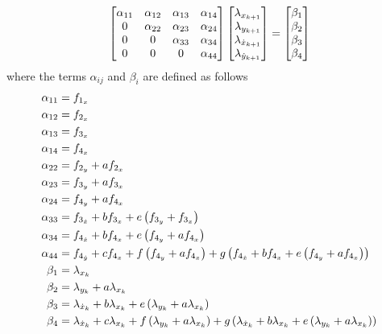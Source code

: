\documentclass[letterpaper, preprint, paper,11pt]{AAS}	%
\begin{document}
\begin{align}\label{eq:costate_ref}
	\begin{bmatrix} 
		\alpha_{11} & \alpha_{12} & \alpha_{13} & \alpha_{14} \\
		0 & \alpha_{22} & \alpha_{23} & \alpha_{24} \\
		0 & 0 & \alpha_{33} & \alpha_{34} \\
		0 & 0 & 0 & \alpha_{44}
	\end{bmatrix}
	\begin{bmatrix} \lambda_{\xkp} \\ \lambda_{\ykp} \\ \lambda_{\xdotkp} \\ \lambda_{\ydotkp} \end{bmatrix}
	=
	\begin{bmatrix} \beta_1 \\ \beta_2 \\ \beta_3 \\ \beta_4 \end{bmatrix}
\end{align}
where the terms \( \alpha_{ij} \) and \( \beta_{i} \) are defined as follows
\begin{subequations}
\begin{align}
	\alpha_{11} &= f_{1_x} \\
	\alpha_{12} &= f_{2_x} \\
	\alpha_{13} &= f_{3_x} \\
	\alpha_{14} &= f_{4_x} \\
	\alpha_{22} &= f_{2_y} + a f_{2_x} \\
	\alpha_{23} &= f_{3_y} + af_{3_x} \\
	\alpha_{24} &= f_{4_y} + a f_{4_x} \\
	\alpha_{33} &= f_{3_{\dot x}} + b f_{3_x} + e \left( f_{3_y} + f_{3_x} \right)\\
	\alpha_{34} &= f_{4_{\dot x}} + b f_{4_x} + e \left( f_{4_y} + a f_{4_x} \right) \\
	\alpha_{44} &= f_{4_{\dot y}} + c f_{4_x} + f \left( f_{4_y} + a f_{4_x} \right) + g \left( f_{4_{\dot x}} + b f_{4_x} + e \left( f_{4_y} + a f_{4_x} \right) \right) \\
	\beta_1 &= \lambda_{x_k} \\
	\beta_2 &= \lambda_{y_{k}} + a \lambda_{x_k} \\
	\beta_3 &= \lambda_{\dot{x}_{k}} + b \lambda_{x_k} + e \left( \lambda_{y_{k}} + a \lambda_{x_k} \right) \\
	\beta_4 &= \lambda_{\dot{x}_{k}} + c \lambda_{x_k} + f \left( \lambda_{y_{k}}+a \lambda_{x_k} \right) + g \left( \lambda_{\dot{x}_{k}} + b \lambda_{x_k} + e \left( \lambda_{y_{k}} + a \lambda_{x_k} \right) \right) 
\end{align}
\end{subequations}
\end{document}
